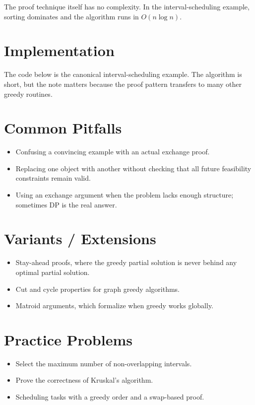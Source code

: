 The proof technique itself has no complexity. In the interval-scheduling example, sorting dominates and the algorithm
runs in \(O(n \log n)\).

\section*{Implementation}

The code below is the canonical interval-scheduling example. The algorithm is short, but the note matters because the
proof pattern transfers to many other greedy routines.

\section*{Common Pitfalls}

\begin{itemize}
  \item Confusing a convincing example with an actual exchange proof.
  \item Replacing one object with another without checking that all future feasibility constraints remain valid.
  \item Using an exchange argument when the problem lacks enough structure; sometimes DP is the real answer.
\end{itemize}

\section*{Variants / Extensions}

\begin{itemize}
  \item Stay-ahead proofs, where the greedy partial solution is never behind any optimal partial solution.
  \item Cut and cycle properties for graph greedy algorithms.
  \item Matroid arguments, which formalize when greedy works globally.
\end{itemize}

\section*{Practice Problems}

\begin{itemize}
  \item Select the maximum number of non-overlapping intervals.
  \item Prove the correctness of Kruskal's algorithm.
  \item Scheduling tasks with a greedy order and a swap-based proof.
\end{itemize}

